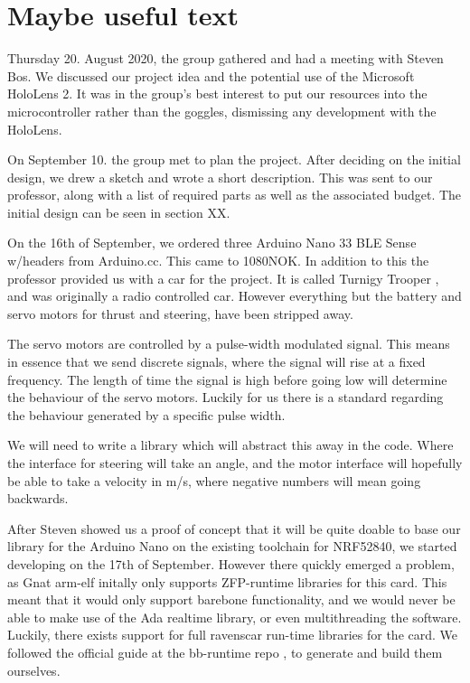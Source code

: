 \documentclass{article}
\begin{document}
\newpage
\section{Maybe useful text}

Thursday 20. August 2020, the group gathered and had a meeting with Steven Bos. We discussed our project idea and the potential use of the Microsoft HoloLens 2. It was in the group's best interest to put our resources into the microcontroller rather than the goggles, dismissing any development with the HoloLens.

\vspace{5mm}
On September 10. the group met to plan the project. After deciding on the initial design, we drew a sketch and wrote a short description. This was sent to our professor, along with a list of required parts as well as the associated budget. The initial design can be seen in section XX.

\vspace{5mm}

On the 16th of September, we ordered three Arduino Nano 33 BLE Sense w/headers from Arduino.cc. This came to 1080NOK. In addition to this the professor provided us with a car for the project. It is called Turnigy Trooper \cite{CAR}, and was originally a radio controlled car. However everything but the battery and servo motors for thrust and steering, have been stripped away. 

The servo motors are controlled by a pulse-width modulated signal. This means in essence that we send discrete signals, where the signal will rise at a fixed frequency. The length of time the signal is high before going low will determine the behaviour of the servo motors. Luckily for us there is a standard regarding the behaviour generated by a specific pulse width. 

We will need to write a library which will abstract this away in the code. Where the interface for steering will take an angle, and the motor interface will hopefully be able to take a velocity in m/s, where negative numbers will mean going backwards.

\vspace{5mm}
After Steven showed us a proof of concept that it will be quite doable to base our library for the Arduino Nano on the existing toolchain for NRF52840, we started developing on the 17th of September. However there quickly emerged a problem, as Gnat arm-elf initally only supports ZFP-runtime libraries for this card. This meant that it would only support barebone functionality, and we would never be able to make use of the Ada realtime library, or even multithreading the software. Luckily, there exists support for full ravenscar run-time libraries for the card. We followed the official guide at the bb-runtime repo \cite{BBRUNTIMES}, to generate and build them ourselves.
\end{document}
